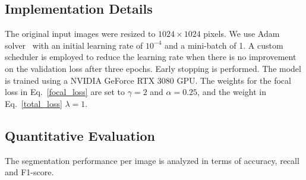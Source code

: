  






\vspace{-0.5cm}
\subsection{Implementation Details} \label{sec:training-seg}
\vspace{-0.1cm}

The original input images were resized to $1024 \times 1024$ pixels. We use Adam solver~\cite{adam} with an initial learning rate of $10^{-4}$ and a mini-batch of 1. A custom scheduler is employed to reduce the learning rate when there is no improvement on the validation loss after three epochs. Early stopping is performed. The model is trained using a NVIDIA GeForce RTX 3080 GPU. The weights for the focal loss in Eq.~\eqref{focal_loss} are set to $\gamma=2$ and $\alpha=0.25$, and the weight in Eq.~\eqref{total_loss} $\lambda=1$.



\vspace{-0.5cm}
\subsection{Quantitative Evaluation}
\vspace{-0.1cm}



The segmentation performance per image is analyzed in terms of accuracy, recall and F1-score. %



